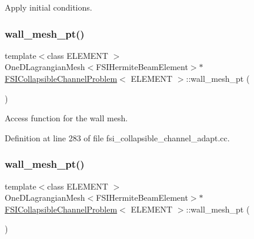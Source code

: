 Apply initial conditions. 

\mbox{\label{classFSICollapsibleChannelProblem_ae8b71da8da82f3c52387052ce400b930}} 
\subsubsection{\texorpdfstring{wall\+\_\+mesh\+\_\+pt()}{wall\_mesh\_pt()}\hspace{0.1cm}{\footnotesize\ttfamily [1/4]}}
{\footnotesize\ttfamily template$<$class E\+L\+E\+M\+E\+NT $>$ \\
One\+D\+Lagrangian\+Mesh$<$F\+S\+I\+Hermite\+Beam\+Element$>$$\ast$ \hyperlink{classFSICollapsibleChannelProblem}{F\+S\+I\+Collapsible\+Channel\+Problem}$<$ E\+L\+E\+M\+E\+NT $>$\+::wall\+\_\+mesh\+\_\+pt (\begin{DoxyParamCaption}{ }\end{DoxyParamCaption})\hspace{0.3cm}{\ttfamily [inline]}}



Access function for the wall mesh. 



Definition at line 283 of file fsi\+\_\+collapsible\+\_\+channel\+\_\+adapt.\+cc.

\mbox{\label{classFSICollapsibleChannelProblem_ae8b71da8da82f3c52387052ce400b930}} 
\subsubsection{\texorpdfstring{wall\+\_\+mesh\+\_\+pt()}{wall\_mesh\_pt()}\hspace{0.1cm}{\footnotesize\ttfamily [2/4]}}
{\footnotesize\ttfamily template$<$class E\+L\+E\+M\+E\+NT $>$ \\
One\+D\+Lagrangian\+Mesh$<$F\+S\+I\+Hermite\+Beam\+Element$>$$\ast$ \hyperlink{classFSICollapsibleChannelProblem}{F\+S\+I\+Collapsible\+Channel\+Problem}$<$ E\+L\+E\+M\+E\+NT $>$\+::wall\+\_\+mesh\+\_\+pt (\begin{DoxyParamCaption}{ }\end{DoxyParamCaption})\hspace{0.3cm}{\ttfamily [inline]}}



